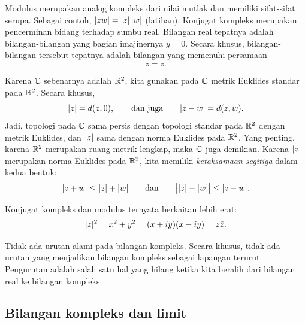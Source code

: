 Modulus merupakan analog kompleks dari nilai mutlak dan
memiliki sifat-sifat serupa.
Sebagai contoh,
$\lvert {zw} \rvert = \lvert {z} \rvert \, \lvert {w} \rvert$ (latihan).
Konjugat kompleks merupakan pencerminan bidang terhadap sumbu real.
Bilangan real tepatnya adalah bilangan-bilangan yang bagian imajinernya
$y=0$. Secara khusus, bilangan-bilangan tersebut tepatnya adalah
bilangan yang memenuhi persamaan
\begin{equation*}
z = \bar{z} .
\end{equation*}

Karena ${\mathbb{C}}$ sebenarnya adalah ${\mathbb{R}}^2$, kita gunakan pada ${\mathbb{C}}$ metrik
Euklides standar pada ${\mathbb{R}}^2$.
Secara khusus,
\begin{equation*}
\lvert {z} \rvert = d(z,0) , \qquad 
\text{dan juga} \qquad 
\lvert {z-w} \rvert = d(z,w) .
\end{equation*}
Jadi, topologi pada ${\mathbb{C}}$ sama persis dengan topologi standar pada ${\mathbb{R}}^2$
dengan metrik Euklides,
dan $\lvert {z} \rvert$ sama dengan norma Euklides pada ${\mathbb{R}}^2$.
Yang penting, karena ${\mathbb{R}}^2$ merupakan ruang metrik lengkap, maka
${\mathbb{C}}$ juga demikian.
Karena $\lvert {z} \rvert$ merupakan norma Euklides pada ${\mathbb{R}}^2$, kita memiliki
\emph{ketaksamaan segitiga}
dalam kedua bentuk:
\begin{equation*}
\lvert {z+w} \rvert \leq \lvert {z} \rvert+\lvert {w} \rvert \qquad \text{dan} \qquad
\big\lvert \lvert {z} \rvert-\lvert {w} \rvert \big\rvert \leq \lvert {z-w} \rvert .
\end{equation*}

Konjugat kompleks dan modulus ternyata berkaitan lebih erat:
\begin{equation*}
\lvert {z} \rvert^2 =
x^2+y^2 =
(x+iy)(x-iy) =
z \bar{z} .
\end{equation*}

\begin{remark}
Tidak ada urutan alami pada bilangan kompleks.
Secara khusus,
tidak ada urutan yang menjadikan bilangan kompleks sebagai lapangan terurut.
Pengurutan adalah salah satu hal yang hilang ketika kita beralih dari bilangan real
ke bilangan kompleks.
\end{remark}

\subsection{Bilangan kompleks dan limit}

